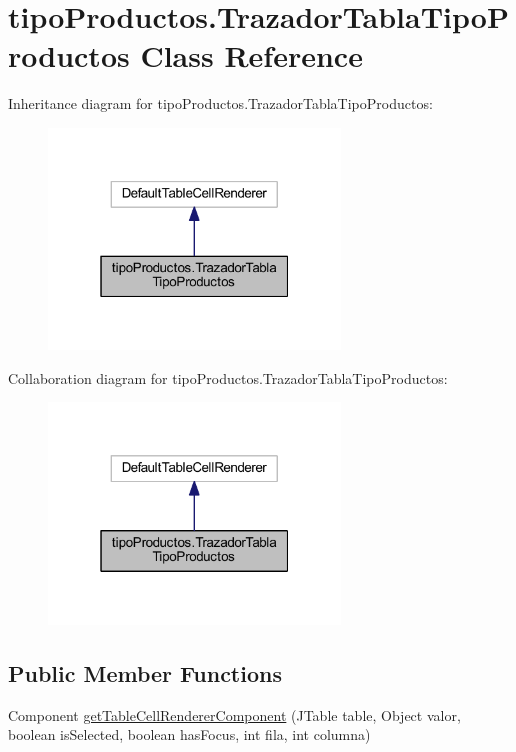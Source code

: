 \hypertarget{classtipo_productos_1_1_trazador_tabla_tipo_productos}{}\section{tipo\+Productos.\+Trazador\+Tabla\+Tipo\+Productos Class Reference}
\label{classtipo_productos_1_1_trazador_tabla_tipo_productos}


Inheritance diagram for tipo\+Productos.\+Trazador\+Tabla\+Tipo\+Productos\+:
\nopagebreak
\begin{figure}[H]
\begin{center}
\leavevmode
\includegraphics[width=220pt]{classtipo_productos_1_1_trazador_tabla_tipo_productos__inherit__graph}
\end{center}
\end{figure}


Collaboration diagram for tipo\+Productos.\+Trazador\+Tabla\+Tipo\+Productos\+:
\nopagebreak
\begin{figure}[H]
\begin{center}
\leavevmode
\includegraphics[width=220pt]{classtipo_productos_1_1_trazador_tabla_tipo_productos__coll__graph}
\end{center}
\end{figure}
\subsection*{Public Member Functions}
\begin{DoxyCompactItemize}
\item 
Component \mbox{\hyperlink{classtipo_productos_1_1_trazador_tabla_tipo_productos_a21e09bccb69f0edb28992932c136d187}{get\+Table\+Cell\+Renderer\+Component}} (J\+Table table, Object valor, boolean is\+Selected, boolean has\+Focus, int fila, int columna)
\end{DoxyCompactItemize}


